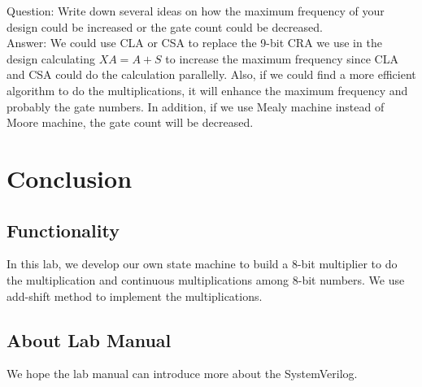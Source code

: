 \documentclass[12pt]{article}
\begin{document}
Question: Write down several ideas on how the maximum frequency of your design could be increased or the gate count could be decreased. \\

Answer: We could use CLA or CSA to replace the 9-bit CRA we use in the design calculating $XA=A+S$ to increase the maximum frequency since CLA and CSA could do the calculation parallelly. Also, if we could find a more efficient algorithm to do the multiplications, it will enhance the maximum frequency and probably the gate numbers. In addition, if we use Mealy machine instead of Moore machine, the gate count will be decreased.


\section{Conclusion}
\subsection{Functionality}
In this lab, we develop our own state machine to build a 8-bit multiplier to do the multiplication and continuous multiplications among 8-bit numbers. We use add-shift method to implement the multiplications.
\subsection{About Lab Manual}
We hope the lab manual can introduce more about the SystemVerilog.

\newpage


\end{document}
